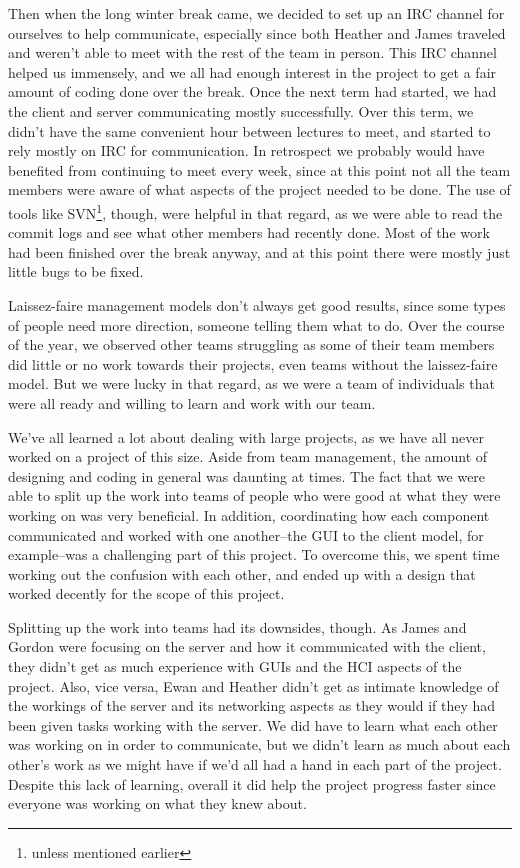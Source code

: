 Then when the long winter break came, we decided to set up an IRC channel for ourselves to help communicate, especially since both Heather and James traveled and weren't able to meet with the rest of the team in person. This IRC channel helped us immensely, and we all had enough interest in the project to get a fair amount of coding done over the break. Once the next term had started, we had the client and server communicating mostly successfully. Over this term, we didn't have the same convenient hour between lectures to meet, and started to rely mostly on IRC for communication. In retrospect we probably would have benefited from continuing to meet every week, since at this point not all the team members were aware of what aspects of the project needed to be done. The use of tools like SVN\footnote{unless mentioned earlier}, though, were helpful in that regard, as we were able to read the commit logs and see what other members had recently done. Most of the work had been finished over the break anyway, and at this point there were mostly just little bugs to be fixed.

Laissez-faire management models don't always get good results, since some types of people need more direction, someone telling them what to do. Over the course of the year, we observed other teams struggling as some of their team members did little or no work towards their projects, even teams without the laissez-faire model. But we were lucky in that regard, as we were a team of individuals that were all ready and willing to learn and work with our team.

We've all learned a lot about dealing with large projects, as we have all never worked on a project of this size. Aside from team management, the amount of designing and coding in general was daunting at times. The fact that we were able to split up the work into teams of people who were good at what they were working on was very beneficial. In addition, coordinating how each component communicated and worked with one another--the GUI to the client model, for example--was a challenging part of this project. To overcome this, we spent time working out the confusion with each other, and ended up with a design that worked decently for the scope of this project.

Splitting up the work into teams had its downsides, though. As James and Gordon were focusing on the server and how it communicated with the client, they didn't get as much experience with GUIs and the HCI aspects of the project. Also, vice versa, Ewan and Heather didn't get as intimate knowledge of the workings of the server and its networking aspects as they would if they had been given tasks working with the server. We did have to learn what each other was working on in order to communicate, but we didn't learn as much about each other's work as we might have if we'd all had a hand in each part of the project. Despite this lack of learning, overall it did help the project progress faster since everyone was working on what they knew about.

